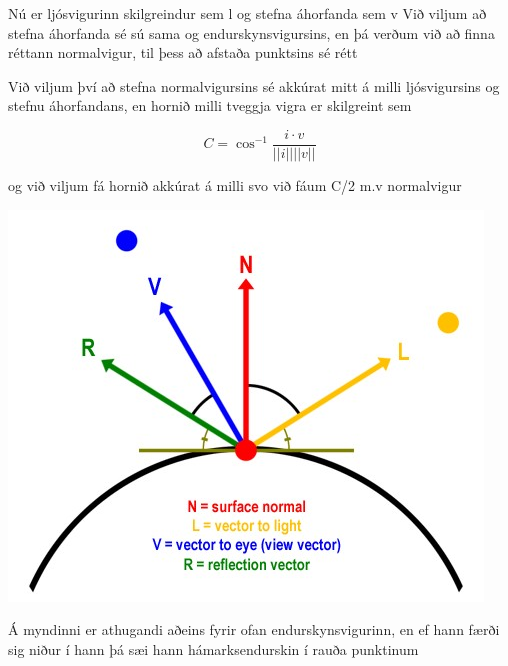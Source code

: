 \documentclass[11pt,twocolumn]{article}
\begin{document}
Nú er ljósvigurinn skilgreindur sem l og stefna áhorfanda sem v
Við viljum að stefna áhorfanda sé sú sama og endurskynsvigursins, en þá verðum við að finna réttann normalvigur, til þess að afstaða punktsins sé rétt

Við viljum því að stefna normalvigursins sé akkúrat mitt á milli ljósvigursins og stefnu áhorfandans, en hornið milli tveggja vigra er skilgreint sem

\[
C = \cos^{-1}\frac{i\cdot v}{||i||||v||}
\]

og við viljum fá hornið akkúrat á milli svo við fáum C/2 m.v normalvigur

\includegraphics[width = \linewidth]{1.jpg}

Á myndinni er athugandi aðeins fyrir ofan endurskynsvigurinn, en ef hann færði sig niður í hann þá sæi hann hámarksendurskin í rauða punktinum
\end{document}

